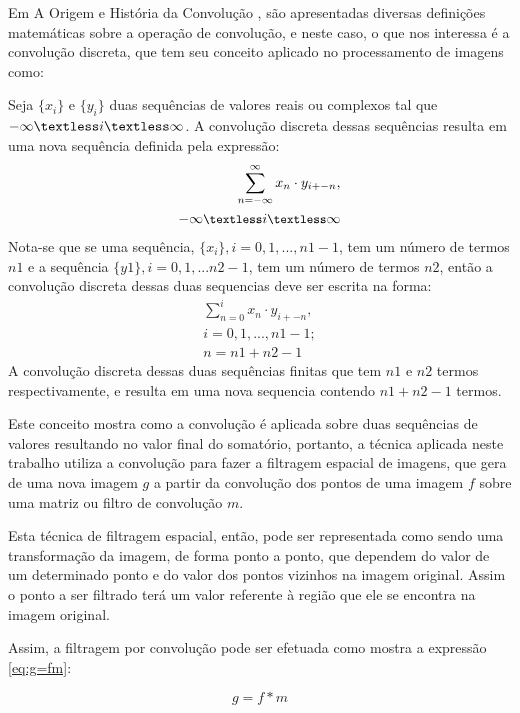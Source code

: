 Em A Origem e História da Convolução \cite{dominguez2010origin}, são apresentadas diversas definições matemáticas sobre a operação de convolução, e neste caso, o que nos interessa é a convolução discreta, que tem seu conceito aplicado no processamento de imagens como:

\begin{citacao}
Seja \(\{x_{i}\}\) e \(\{y_{i}\}\) duas sequências de valores reais ou complexos tal que \(-\infty \textless i \textless \infty\). A convolução discreta dessas sequências resulta em uma nova sequência definida pela expressão:
\[\begin{split}
\sum_{n=-\infty}^{\infty}x_{n} \cdot y_{i+-n}, \\ \small{-\infty \textless i \textless \infty}
\end{split}\] 
Nota-se que se uma sequência, \(\{x_{i}\}, i = 0, 1, ..., n1-1\), tem um número de termos \(n1\) e a sequência \(\{y1\}, i = 0, 1, ... n2-1\), tem um número de termos \(n2\), então a convolução discreta dessas duas sequencias deve ser escrita na forma:
\[\begin{split}
\sum_{n=0}^{i} x_{n} \cdot y_{i+-n}, \\i = 0, 1, ..., n1-1; \\n = n1 + n2 - 1
\end{split}\]
A convolução discreta dessas duas sequências finitas que tem \(n1\) e \(n2\) termos respectivamente, e resulta em uma nova sequencia contendo \(n1+n2-1\) termos. \cite{dominguez2010origin}
\end{citacao}

Este conceito mostra como a convolução é aplicada sobre duas sequências de valores resultando no valor final do somatório, portanto, a técnica aplicada neste trabalho utiliza a convolução para fazer a filtragem espacial de imagens, que gera de uma nova imagem \(g\) a partir da convolução dos pontos de uma imagem \(f\) sobre uma matriz ou filtro de convolução \(m\).

Esta técnica de filtragem espacial, então, pode ser representada como sendo uma transformação da imagem, de forma ponto a ponto, que dependem do valor de um determinado ponto e do valor dos pontos vizinhos na imagem original. Assim o ponto a ser filtrado terá um valor referente à região que ele se encontra na imagem original. 

Assim, a filtragem por convolução pode ser efetuada como mostra a expressão \ref{eq:g=fm}:

\begin{equation}
\label{eq:g=fm}
g = f * m
\end{equation}

